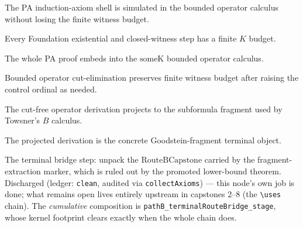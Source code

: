 \begin{theorem}\label{thm:pathBInductionAxiomShell}
  \notready
The PA induction-axiom shell is simulated in the bounded operator calculus without losing the finite
witness budget.
\end{theorem}

\begin{theorem}\label{thm:pathBClosedWitnessBudgets}
  \notready
Every Foundation existential and closed-witness step has a finite \(K\) budget.
\end{theorem}

\begin{theorem}\label{thm:pathBSomeKStructuralEmbedding}
  \notready
The whole PA proof embeds into the \(\mathrm{someK}\) bounded operator calculus.
\end{theorem}

\begin{theorem}\label{thm:pathBOperatorCutElimination}
  \notready
Bounded operator cut-elimination preserves finite witness budget after raising the control ordinal
as needed.
\end{theorem}

\begin{theorem}\label{thm:pathBSubformulaProjection}
  \notready
The cut-free operator derivation projects to the subformula fragment used by Towsner's \(B\)
calculus.
\end{theorem}

\begin{theorem}\label{thm:pathBGoodsteinFragmentExtraction}
  \notready
The projected derivation is the concrete Goodstein-fragment terminal object.
\end{theorem}

\begin{theorem}\label{thm:pathBTerminalRouteBridge}
  \leanok
The terminal bridge step: unpack the \(\mathrm{RouteBCapstone}\) carried by the fragment-extraction
marker, which is ruled out by the promoted lower-bound theorem.  Discharged (ledger: \texttt{clean},
audited via \texttt{collectAxioms}) --- this node's own job is done; what remains open lives entirely
upstream in capstones 2--8 (the \texttt{\textbackslash uses} chain).  The \emph{cumulative}
composition is \texttt{pathB\_terminalRouteBridge\_stage}, whose kernel footprint clears exactly when
the whole chain does.
\end{theorem}

